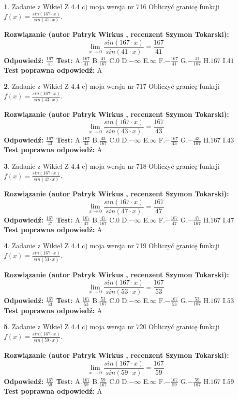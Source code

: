 \documentclass[12pt, a4paper]{article}
\theoremstyle{definition} %
\newtheorem{zad}{}
\newcommand{\zadStart}[1]{\begin{zad}#1\newline}
\newcommand{\zadStop}{\end{zad}}
\newcommand{\rozwStart}[2]{\noindent \textbf{Rozwiązanie (autor #1 , recenzent #2): }\newline}
\newcommand{\rozwStop}{\newline}
\newcommand{\odpStart}{\noindent \textbf{Odpowiedź:}\newline}
\newcommand{\odpStop}{\newline}
\newcommand{\testStart}{\noindent \textbf{Test:}\newline}
\newcommand{\testStop}{\newline}
\newcommand{\kluczStart}{\noindent \textbf{Test poprawna odpowiedź:}\newline}
\newcommand{\kluczStop}{\newline}
\begin{document}
\zadStart{Zadanie z Wikieł Z 4.4 c) moja wersja nr 716}
Obliczyć granicę funkcji $f(x)=\frac{sin(167\cdot x)}{sin(41\cdot x)}$.
\zadStop
\rozwStart{Patryk Wirkus}{Szymon Tokarski}
$$\lim\limits_{x\to 0}\frac{sin(167\cdot x)}{sin(41\cdot x)}=
\frac{167}{41}$$
\rozwStop
\odpStart
$\frac{167}{41}$
\odpStop
\testStart
A.$\frac{167}{41}$
B.$\frac{41}{167}$
C.$0$
D.$-\infty$
E.$\infty$
F.$-\frac{167}{41}$
G.$-\frac{41}{167}$
H.$167$
I.$41$
\testStop
\kluczStart
A
\kluczStop



\zadStart{Zadanie z Wikieł Z 4.4 c) moja wersja nr 717}
Obliczyć granicę funkcji $f(x)=\frac{sin(167\cdot x)}{sin(43\cdot x)}$.
\zadStop
\rozwStart{Patryk Wirkus}{Szymon Tokarski}
$$\lim\limits_{x\to 0}\frac{sin(167\cdot x)}{sin(43\cdot x)}=
\frac{167}{43}$$
\rozwStop
\odpStart
$\frac{167}{43}$
\odpStop
\testStart
A.$\frac{167}{43}$
B.$\frac{43}{167}$
C.$0$
D.$-\infty$
E.$\infty$
F.$-\frac{167}{43}$
G.$-\frac{43}{167}$
H.$167$
I.$43$
\testStop
\kluczStart
A
\kluczStop



\zadStart{Zadanie z Wikieł Z 4.4 c) moja wersja nr 718}
Obliczyć granicę funkcji $f(x)=\frac{sin(167\cdot x)}{sin(47\cdot x)}$.
\zadStop
\rozwStart{Patryk Wirkus}{Szymon Tokarski}
$$\lim\limits_{x\to 0}\frac{sin(167\cdot x)}{sin(47\cdot x)}=
\frac{167}{47}$$
\rozwStop
\odpStart
$\frac{167}{47}$
\odpStop
\testStart
A.$\frac{167}{47}$
B.$\frac{47}{167}$
C.$0$
D.$-\infty$
E.$\infty$
F.$-\frac{167}{47}$
G.$-\frac{47}{167}$
H.$167$
I.$47$
\testStop
\kluczStart
A
\kluczStop



\zadStart{Zadanie z Wikieł Z 4.4 c) moja wersja nr 719}
Obliczyć granicę funkcji $f(x)=\frac{sin(167\cdot x)}{sin(53\cdot x)}$.
\zadStop
\rozwStart{Patryk Wirkus}{Szymon Tokarski}
$$\lim\limits_{x\to 0}\frac{sin(167\cdot x)}{sin(53\cdot x)}=
\frac{167}{53}$$
\rozwStop
\odpStart
$\frac{167}{53}$
\odpStop
\testStart
A.$\frac{167}{53}$
B.$\frac{53}{167}$
C.$0$
D.$-\infty$
E.$\infty$
F.$-\frac{167}{53}$
G.$-\frac{53}{167}$
H.$167$
I.$53$
\testStop
\kluczStart
A
\kluczStop



\zadStart{Zadanie z Wikieł Z 4.4 c) moja wersja nr 720}
Obliczyć granicę funkcji $f(x)=\frac{sin(167\cdot x)}{sin(59\cdot x)}$.
\zadStop
\rozwStart{Patryk Wirkus}{Szymon Tokarski}
$$\lim\limits_{x\to 0}\frac{sin(167\cdot x)}{sin(59\cdot x)}=
\frac{167}{59}$$
\rozwStop
\odpStart
$\frac{167}{59}$
\odpStop
\testStart
A.$\frac{167}{59}$
B.$\frac{59}{167}$
C.$0$
D.$-\infty$
E.$\infty$
F.$-\frac{167}{59}$
G.$-\frac{59}{167}$
H.$167$
I.$59$
\testStop
\kluczStart
A
\kluczStop
\end{document}
